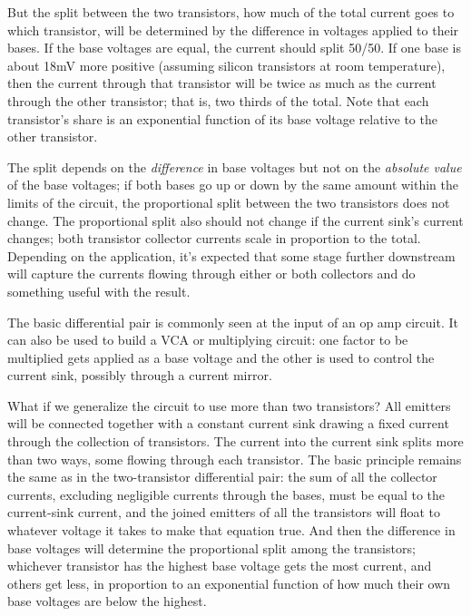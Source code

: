 But the split between the two transistors, how much of the total current
goes to which transistor, will be determined by the difference in voltages
applied to their bases.  If the base voltages are equal, the current should
split 50/50.  If one base is about 18mV more positive (assuming silicon
transistors at room temperature), then the current through that transistor
will be twice as much as the current through the other transistor; that is,
two thirds of the total.  Note that each transistor's share is an
exponential function of its base voltage relative to the other transistor.

The split depends on the \emph{difference} in base
voltages but not on the \emph{absolute value} of the base voltages; if both
bases go up or down by the same amount within the limits of the circuit, the
proportional split between the two transistors does not change.  The
proportional split also should not change if the current sink's current
changes; both transistor collector currents scale in proportion to the
total.  Depending on the application, it's expected that some stage further
downstream will capture the currents flowing through either or both
collectors and do something useful with the result.

The basic differential pair is commonly seen at the input of an op amp
circuit.  It can also be used to build a VCA or multiplying circuit:  one
factor to be multiplied gets applied as a base voltage and the other is used
to control the current sink, possibly through a current mirror.

What if we generalize the circuit to use more than two transistors?  All
emitters will be connected together with a constant current sink drawing a
fixed current through the collection of transistors.  The current into the
current sink splits more than two ways, some flowing through each
transistor.  The basic principle remains the same as in the two-transistor
differential pair: the sum of all the collector currents, excluding
negligible currents through the bases, must be equal to the current-sink
current, and the joined emitters of all the transistors will float to
whatever voltage it takes to make that equation true.  And then the
difference in base voltages will determine the proportional split among the
transistors; whichever transistor has the highest base voltage gets the most
current, and others get less, in proportion to an exponential function of
how much their own base voltages are below the highest.

